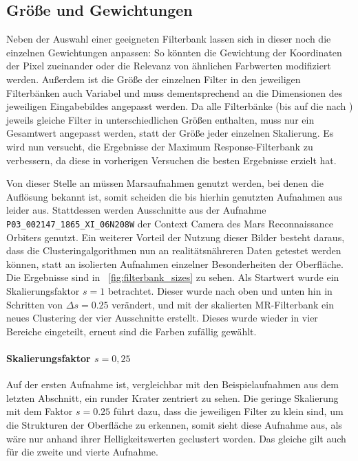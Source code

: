 \subsection{Größe und Gewichtungen}

Neben der Auswahl einer geeigneten Filterbank lassen sich in dieser noch die einzelnen Gewichtungen anpassen: So könnten \zB die Gewichtung der Koordinaten der Pixel zueinander oder die Relevanz von ähnlichen Farbwerten modifiziert werden. Außerdem ist die Größe der einzelnen Filter in den jeweiligen Filterbänken auch Variabel und muss dementsprechend an die Dimensionen des jeweiligen Eingabebildes angepasst werden. Da alle Filterbänke (bis auf die nach \cite{jain_91}) jeweils gleiche Filter in unterschiedlichen Größen enthalten, muss nur ein Gesamtwert angepasst werden, statt der Größe jeder einzelnen Skalierung. Es wird nun versucht, die Ergebnisse der Maximum Response-Filterbank zu verbessern, da diese in vorherigen Versuchen die besten Ergebnisse erzielt hat.

Von dieser Stelle an müssen Marsaufnahmen genutzt werden, bei denen die Auflösung bekannt ist, somit scheiden die bis hierhin genutzten Aufnahmen aus \cite{greeley_13} leider aus. Stattdessen werden Ausschnitte aus der Aufnahme \texttt{P03\_002147\_1865\_XI\_06N208W} der Context Camera des Mars Reconnaissance Orbiters genutzt. Ein weiterer Vorteil der Nutzung dieser Bilder besteht daraus, dass die Clusteringalgorithmen nun an realitätsnähreren Daten getestet werden können, statt an isolierten Aufnahmen einzelner Besonderheiten der Oberfläche. Die Ergebnisse sind in \figurename~\ref{fig:filterbank_sizes} zu sehen. Als Startwert wurde ein Skalierungsfaktor $s=1$ betrachtet. Dieser wurde nach oben und unten hin in Schritten von $\Delta s=0.25$ verändert, und mit der skalierten MR-Filterbank ein neues Clustering der vier Ausschnitte erstellt. Dieses wurde wieder in vier Bereiche eingeteilt, erneut sind die Farben zufällig gewählt.

\paragraph{Skalierungsfaktor $s=0,25$}

Auf der ersten Aufnahme ist, vergleichbar mit den Beispielaufnahmen aus dem letzten Abschnitt, ein runder Krater zentriert zu sehen. Die geringe Skalierung mit dem Faktor $s=0.25$ führt dazu, dass die jeweiligen Filter zu klein sind, um die Strukturen der Oberfläche zu erkennen, somit sieht diese Aufnahme aus, als wäre nur anhand ihrer Helligkeitswerten geclustert worden. Das gleiche gilt auch für die zweite und vierte Aufnahme.

